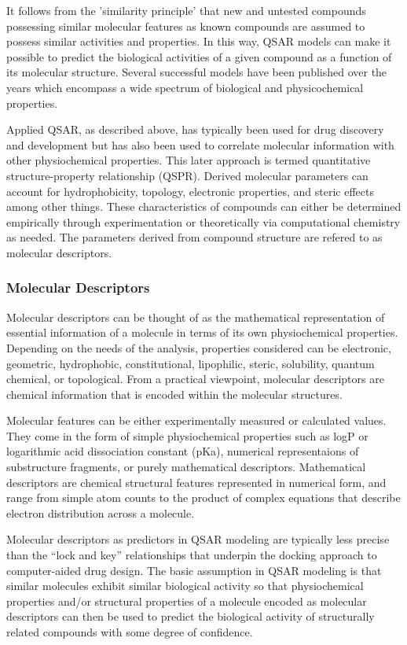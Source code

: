 It follows from the 'similarity principle' that new and untested compounds possessing similar molecular features as known compounds are assumed to possess similar activities and properties. In this way, QSAR models can make it possible to predict the biological activities of a given compound as a function of its molecular structure. Several successful models have been published over the years which encompass a wide spectrum of biological and physicochemical properties.

Applied QSAR, as described above, has typically been used for drug discovery and development but has also been used to correlate molecular information with other physiochemical properties. This later approach is termed quantitative structure-property relationship (QSPR). Derived molecular parameters can account for hydrophobicity, topology, electronic properties, and steric effects among other things. These characteristics of compounds can either be determined empirically through experimentation or theoretically via computational chemistry as needed. \cite{Nantasenamat2009} The parameters derived from compound structure are refered to as molecular descriptors.

\subsubsection{Molecular Descriptors}
Molecular descriptors can be thought of as the mathematical representation of essential information of a molecule in terms of its own physiochemical properties. Depending on the needs of the analysis, properties considered can be electronic, geometric, hydrophobic, constitutional, lipophilic, steric, solubility, quantum chemical, or topological. From a practical viewpoint, molecular descriptors are chemical information that is encoded within the molecular structures. \cite{Nantasenamat2009}

Molecular features can be either experimentally measured or calculated values. They come in the form of simple physiochemical properties such as logP or logarithmic acid dissociation constant (pKa), numerical representaions of substructure fragments, or purely mathematical descriptors. Mathematical descriptors are chemical structural features represented in numerical form, and range from simple atom counts to the product of complex equations that describe electron distribution across a molecule. \cite{Kruhlak2012}

Molecular descriptors as predictors in QSAR modeling are typically less precise than the “lock and key” relationships that underpin the docking approach to computer-aided drug design. The basic assumption in QSAR modeling is that similar molecules exhibit similar biological activity so that physiochemical properties and/or structural properties of a molecule encoded as molecular descriptors can then be used to predict the biological activity of structurally related compounds with some degree of confidence.

